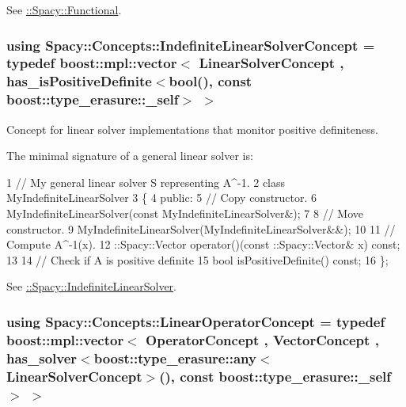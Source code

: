 See \hyperlink{group__SpacyGroup_ga673218f603c93790864aef12c89d3a35_FunctionalAnchor}{\+:\+:Spacy\+:\+:Functional}. \hypertarget{group__ConceptGroup_ga582dd34334cdecc7b27883f4e8239490_ga582dd34334cdecc7b27883f4e8239490}{}
\subsubsection[{Indefinite\+Linear\+Solver\+Concept}]{\setlength{\rightskip}{0pt plus 5cm}using {\bf Spacy\+::\+Concepts\+::\+Indefinite\+Linear\+Solver\+Concept} = typedef boost\+::mpl\+::vector$<$ {\bf Linear\+Solver\+Concept} , has\+\_\+is\+Positive\+Definite$<$bool(), const boost\+::type\+\_\+erasure\+::\+\_\+self$>$ $>$}\label{group__ConceptGroup_ga582dd34334cdecc7b27883f4e8239490_ga582dd34334cdecc7b27883f4e8239490}


Concept for linear solver implementations that monitor positive definiteness. 

\label{group__ConceptGroup_ga582dd34334cdecc7b27883f4e8239490_IndefiniteLinearSolverConceptAnchor}%
\hypertarget{group__ConceptGroup_ga582dd34334cdecc7b27883f4e8239490_IndefiniteLinearSolverConceptAnchor}{}%
The minimal signature of a general linear solver is\+: 
\begin{DoxyCode}
1 // My general linear solver S representing A^-1.
2 class MyIndefiniteLinearSolver
3 \{
4 public:
5   // Copy constructor.
6   MyIndefiniteLinearSolver(const MyIndefiniteLinearSolver&);
7 
8   // Move constructor.
9   MyIndefiniteLinearSolver(MyIndefiniteLinearSolver&&);
10 
11   // Compute A^-1(x).
12   ::Spacy::Vector operator()(const ::Spacy::Vector& x) const;
13 
14   // Check if A is positive definite
15   bool isPositiveDefinite() const;
16 \};
\end{DoxyCode}


See \hyperlink{namespaceSpacy_a168383be933a8316169c145f5e419604_IndefiniteLinearSolverAnchor}{\+:\+:Spacy\+:\+:Indefinite\+Linear\+Solver}. \hypertarget{group__ConceptGroup_gaf0e18e41c434cfceb77ccb8e785a8055_gaf0e18e41c434cfceb77ccb8e785a8055}{}
\subsubsection[{Linear\+Operator\+Concept}]{\setlength{\rightskip}{0pt plus 5cm}using {\bf Spacy\+::\+Concepts\+::\+Linear\+Operator\+Concept} = typedef boost\+::mpl\+::vector$<$ {\bf Operator\+Concept} , {\bf Vector\+Concept} , has\+\_\+solver$<$boost\+::type\+\_\+erasure\+::any$<${\bf Linear\+Solver\+Concept}$>$(), const boost\+::type\+\_\+erasure\+::\+\_\+self$>$ $>$}\label{group__ConceptGroup_gaf0e18e41c434cfceb77ccb8e785a8055_gaf0e18e41c434cfceb77ccb8e785a8055}



